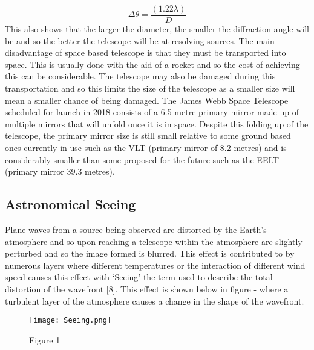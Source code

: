 \documentclass[pdf,color]{UoBnote}
\begin{document}
\begin{equation}
\Delta\theta= \frac{(1.22 \lambda)}D
\end{equation}
\newline
This also shows that the larger the diameter, the smaller the diffraction angle will be and so the better the telescope will be at resolving sources.
The main disadvantage of space based telescope is that they must be transported into space. This is usually done with the aid of a rocket and so the cost of achieving this can be considerable. The telescope may also be damaged during this transportation and so this limits the size of the telescope as a smaller size will mean a smaller chance of being damaged. The James Webb Space Telescope scheduled for launch in 2018 consists of a 6.5 metre primary mirror made up of multiple mirrors that will unfold once it is in space. Despite this folding up of the telescope, the primary mirror size is still small relative to some ground based ones currently in use such as the VLT (primary mirror of 8.2 metres) and is considerably smaller than some proposed for the future such as the EELT (primary mirror 39.3 metres).


\subsection{Astronomical Seeing}
Plane waves from a source being observed are distorted by the Earth’s atmosphere and so upon reaching a telescope within the atmosphere are slightly perturbed and so the image formed is blurred. This effect is contributed to by numerous layers where different temperatures or the interaction of different wind speed causes this effect with ‘Seeing’ the term used to describe the total distortion of the wavefront [8]. This effect is shown below in figure - where a turbulent layer of the atmosphere causes a change in the shape of the wavefront.\\
\newline
\begin{figure}[H]
\begin{center}
\texttt{[image: Seeing.png]}
\end{center}
\caption{Figure 1}\label{fig:figure1}
\end{figure}
\end{document}
